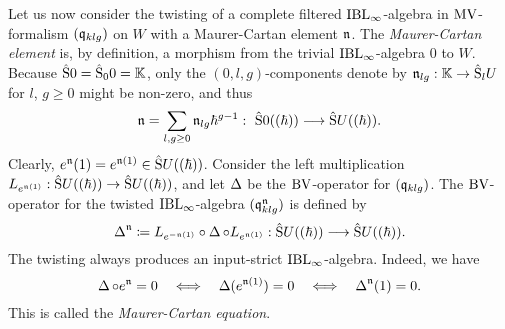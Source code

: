 \documentclass[\MainFolder/Text.tex]{subfiles}
\begin{document}

Let us now consider the twisting of a complete filtered $\mathrm{IBL}_\infty$-algebra in $\mathrm{MV}$-formalism $(\mathfrak{q}_{klg})$ on $W$ with a Maurer-Cartan element $\mathfrak{n}$. The \emph{Maurer-Cartan element} is, by definition, a morphism from the trivial $\mathrm{IBL}_\infty$-algebra $0$ to $W$. Because $\hat{\mathrm{S}}0 = \hat{\mathrm{S}}_0 0 = \mathbb{K}$, only the $(0,l,g)$-components denote by $\mathfrak{n}_{lg}: \mathbb{K} \rightarrow \hat{\mathrm{S}}_l U$ for $l$, $g\ge 0$ might be non-zero, and thus
$$ \PMC = \sum_{l,g \ge 0} \PMC_{lg} \hbar^{g-1}:\ \hat{\Sym}0((\hbar))\longrightarrow\hat{\Sym}U((\hbar)).$$
Clearly, $e^{\mathfrak{n}}(1) = e^{\mathfrak{n}(1)}\in \hat{\mathrm{S}}U((\hbar))$. Consider the left multiplication $L_{e^{\mathfrak{n}(1)}}: \hat{\mathrm{S}}U((\hbar)) \rightarrow \hat{\mathrm{S}}U((\hbar))$, and let $\operatorname{\Delta}$ be the $\mathrm{BV}$-operator for $(\mathfrak{q}_{klg})$. The $\mathrm{BV}$-operator for the twisted $\mathrm{IBL}_\infty$-algebra $(\mathfrak{q}_{klg}^{\mathfrak{n}})$ is defined by
\begin{equation}\label{Eq:TwistingEq}
\operatorname{\Delta}^{\mathfrak{n}} \coloneqq L_{e^{-\mathfrak{n}(1)}} \circ \operatorname{\Delta} \circ L_{e^{\mathfrak{n}(1)}}:\hat{\mathrm{S}}U((\hbar))\longrightarrow\hat{\mathrm{S}}U((\hbar)).
\end{equation}
The twisting always produces an input-strict $\mathrm{IBL}_\infty$-algebra. Indeed, we have
$$ \operatorname{\Delta} \circ e^{\mathfrak{n}} = 0\quad\Longleftrightarrow\quad\operatorname{\Delta}(e^{\mathfrak{n}(1)})=0\quad\Longleftrightarrow\quad\operatorname{\Delta}^{\mathfrak{n}}(1) = 0. $$
This is called the \emph{Maurer-Cartan equation}.
\end{document}
